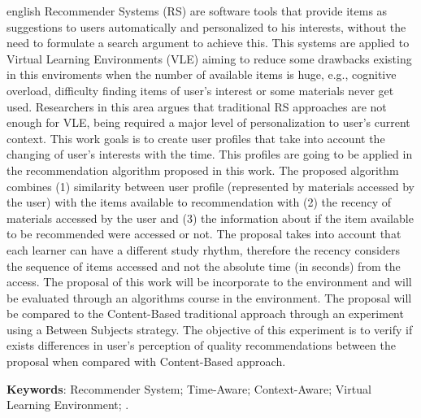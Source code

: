 \begin{resumo}[Abstract]
 \begin{otherlanguage*}{english}
  	Recommender Systems (RS) are software tools that provide items as suggestions to users automatically and personalized to his
    interests, without the need to formulate a search argument to achieve this. This systems are applied to Virtual Learning
    Environments (VLE) aiming to reduce some drawbacks existing in this enviroments when the number of available items is
    huge, e.g., cognitive overload, difficulty finding items of user's interest or some materials never get used. Researchers
    in this area argues that traditional RS approaches are not enough for VLE, being required a major level of personalization
    to user's current context. This work goals is to create user profiles that take into account the changing of user's interests
    with the time. This profiles are going to be applied in the recommendation algorithm proposed in this work. The proposed
    algorithm combines (1) similarity between user profile (represented by materials accessed by the user) with the items
    available to recommendation with (2) the recency of materials accessed by the user and (3) the information about if
    the item available to be recommended were accessed or not. The proposal takes into account that each learner can have
    a different study rhythm, therefore the recency considers the sequence of items accessed and not the absolute time (in
    seconds) from the access. The proposal of this work will be incorporate to the \adaptweb environment and will be evaluated
    through an algorithms course in the environment. The proposal will be compared to the Content-Based traditional approach
    through an experiment using a Between Subjects strategy. The objective of this experiment is to verify if exists differences
    in user's perception of quality recommendations between the proposal when compared with Content-Based approach.
    \vspace{\onelineskip}

    \noindent
    \textbf{Keywords}: Recommender System; Time-Aware; Context-Aware; Virtual Learning Environment; \adaptweb.
 \end{otherlanguage*}
\end{resumo}

\listoffigures*
\cleardoublepage

\listoftables*
\cleardoublepage